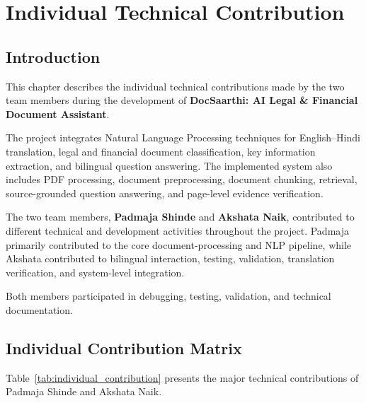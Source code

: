 
\chapter{Individual Technical Contribution}
\label{chap:individual_contribution}

\section{Introduction}

This chapter describes the individual technical contributions made by
the two team members during the development of
\textbf{DocSaarthi: AI Legal \& Financial Document Assistant}.

The project integrates Natural Language Processing techniques for
English--Hindi translation, legal and financial document
classification, key information extraction, and bilingual question
answering. The implemented system also includes PDF processing,
document preprocessing, document chunking, retrieval, source-grounded
question answering, and page-level evidence verification.

The two team members, \textbf{Padmaja Shinde} and
\textbf{Akshata Naik}, contributed to different technical and
development activities throughout the project. Padmaja primarily
contributed to the core document-processing and NLP pipeline, while
Akshata contributed to bilingual interaction, testing, validation,
translation verification, and system-level integration.

Both members participated in debugging, testing, validation, and
technical documentation.

\section{Individual Contribution Matrix}

Table~\ref{tab:individual_contribution} presents the major technical
contributions of Padmaja Shinde and Akshata Naik.

